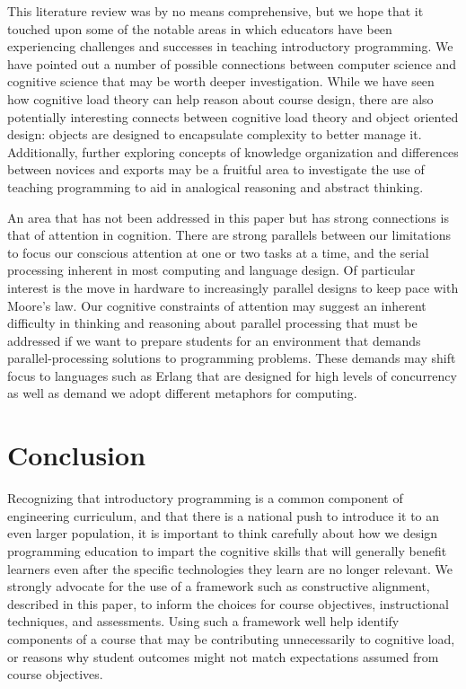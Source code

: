 \documentclass[12pt]{article}
\begin{document}
This literature review was by no means comprehensive, but we hope that
it touched upon some of the notable areas in which educators have been
experiencing challenges and successes in teaching introductory
programming. We have pointed out a number of possible connections
between computer science and cognitive science that may be worth
deeper investigation. While we have seen how cognitive load theory can
help reason about course design, there are also potentially
interesting connects between cognitive load theory and object oriented
design: objects are designed to encapsulate complexity to better
manage it. Additionally, further exploring concepts of knowledge
organization and differences between novices and exports may be a
fruitful area to investigate the use of teaching programming to aid in
analogical reasoning and abstract
thinking\autocite{bennedssen_abstraction_2008}.

An area that has not been addressed in this paper but has strong
connections is that of attention in
cognition\autocite{simon_role_1986}. There are strong parallels
between our limitations to focus our conscious attention at one or two
tasks at a time, and the serial processing inherent in most computing
and language design. Of particular interest is the move in hardware to
increasingly parallel designs to keep pace with Moore's law. Our
cognitive constraints of attention may suggest an inherent difficulty
in thinking and reasoning about parallel processing that must be
addressed if we want to prepare students for an environment that
demands parallel-processing solutions to programming problems. These
demands may shift focus to languages such as Erlang that are designed
for high levels of concurrency as well as demand we adopt different
metaphors for computing\autocite{stein_challenging_1999}.

\section*{Conclusion}

Recognizing that introductory programming is a common component of
engineering curriculum, and that there is a national push to introduce
it to an even larger population, it is important to think carefully
about how we design programming education to impart the cognitive
skills that will generally benefit learners even after the specific
technologies they learn are no longer relevant. We strongly advocate
for the use of a framework such as constructive alignment, described in
this paper, to inform the choices for course objectives, instructional
techniques, and assessments. Using such a framework well help identify
components of a course that may be contributing unnecessarily to
cognitive load, or reasons why student outcomes might not match
expectations assumed from course objectives.
\end{document}
